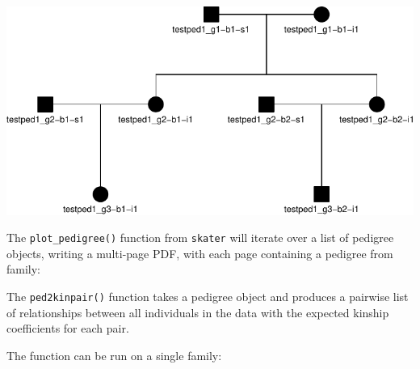 \documentclass[9pt,a4paper,]{extarticle}
\newenvironment{Shaded}{\begin{snugshade}}{\end{snugshade}}
\newcommand{\DataTypeTok}[1]{\textcolor[rgb]{0.13,0.29,0.53}{#1}}
\newcommand{\DecValTok}[1]{\textcolor[rgb]{0.00,0.00,0.81}{#1}}
\newcommand{\KeywordTok}[1]{\textcolor[rgb]{0.13,0.29,0.53}{\textbf{#1}}}
\newcommand{\NormalTok}[1]{#1}
\newcommand{\OperatorTok}[1]{\textcolor[rgb]{0.81,0.36,0.00}{\textbf{#1}}}
\newcommand{\StringTok}[1]{\textcolor[rgb]{0.31,0.60,0.02}{#1}}
\begin{document}
\begin{Shaded}
\end{Shaded}

\begin{center}\includegraphics{paper_files/figure-latex/plotped-1} \end{center}

The \texttt{plot\_pedigree()} function from \texttt{skater} will iterate over a list of pedigree objects, writing a multi-page PDF, with each page containing a pedigree from family:

\begin{Shaded}
\end{Shaded}

The \texttt{ped2kinpair()} function takes a pedigree object and produces a pairwise list of relationships between all individuals in the data with the expected kinship coefficients for each pair.

The function can be run on a single family:

\begin{Shaded}
\end{Shaded}
\end{document}
